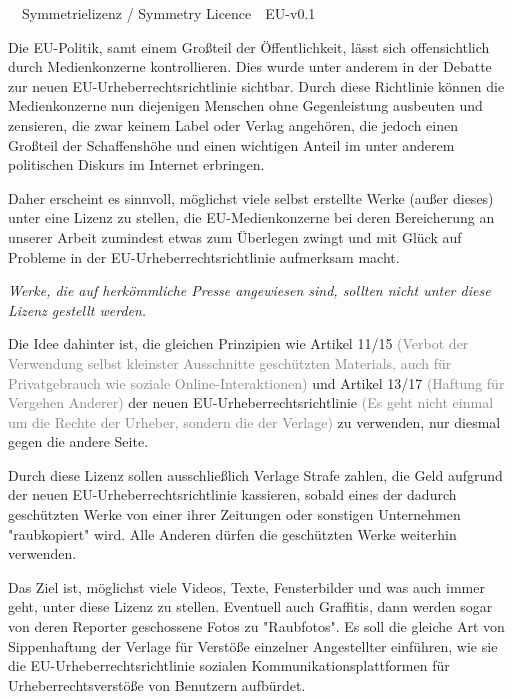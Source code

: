 \documentclass[a4paper,8pt]{extarticle}
\author{}
\date{}
\begin{document}
 
\frenchspacing
\fontsize{8.1pt}{9pt}\selectfont


\begingroup
  \centering
  \LARGE {}\ \ Symmetrielizenz / Symmetry Licence\ \ EU-v0.1\\[3em]
\endgroup


Die EU-Politik, samt einem Großteil der Öffentlichkeit, lässt sich offensichtlich durch Medienkonzerne kontrollieren. Dies wurde unter anderem in der Debatte zur neuen EU-Urheberrechtsrichtlinie sichtbar. Durch diese Richtlinie können die Medienkonzerne nun diejenigen Menschen ohne Gegenleistung ausbeuten und zensieren, die zwar keinem Label oder Verlag angehören, die jedoch einen Großteil der Schaffenshöhe und einen wichtigen Anteil im unter anderem politischen Diskurs im Internet erbringen.

Daher erscheint es sinnvoll, möglichst viele selbst erstellte Werke (außer dieses) unter eine Lizenz zu stellen, die EU-Medienkonzerne bei deren Bereicherung an unserer Arbeit zumindest etwas zum Überlegen zwingt und mit Glück auf Probleme in der EU-Urheberrechtsrichtlinie aufmerksam macht.

\emph{Werke, die auf herkömmliche Presse angewiesen sind, sollten nicht unter diese Lizenz gestellt werden.}

Die Idee dahinter ist, die gleichen Prinzipien wie Artikel 11/15 \textcolor{gray}{(Verbot der Verwendung selbst kleinster Ausschnitte geschützten Materials, auch für Privatgebrauch wie soziale Online-Interaktionen)} und Artikel 13/17 \textcolor{gray}{(Haftung für Vergehen Anderer)} der neuen EU-Urheber\-rechts\-richt\-linie \textcolor{gray}{(Es geht nicht einmal um die Rechte der Urheber, sondern die der Verlage)} zu verwenden, nur diesmal gegen die andere Seite.

Durch diese Lizenz sollen ausschließlich Verlage Strafe zahlen, die Geld aufgrund der neuen EU-Urheber\-rechts\-richt\-linie kassieren, sobald eines der dadurch geschützten Werke von einer ihrer Zeitungen oder sonstigen Unternehmen "raubkopiert" wird. Alle Anderen dürfen die geschützten Werke weiterhin verwenden.

Das Ziel ist, möglichst viele Videos, Texte, Fensterbilder und was auch immer geht, unter diese Lizenz zu stellen. Eventuell auch Graffitis, dann werden sogar von deren Reporter geschossene Fotos zu "Raubfotos". Es soll die gleiche Art von Sippenhaftung der Verlage für Verstöße einzelner Angestellter einführen, wie sie die EU-Urheberrechtsrichtlinie sozialen Kommunikationsplattformen für Urheberrechtsverstöße von Benutzern aufbürdet.
\end{document}
